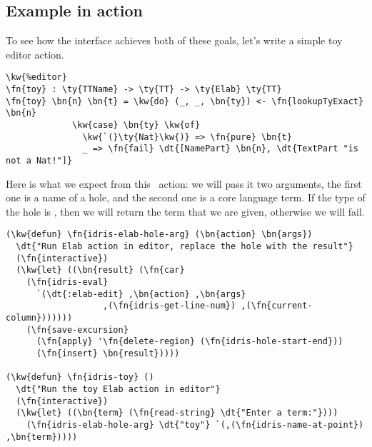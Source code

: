 \subsection{Example in action}\label{ssec:designExample}

To see how the  interface achieves both of these goals, let's
write a simple toy editor action.

\begin{Verbatim}[framesep=2mm, label=\footnotesize{\normalfont{Idris}}, labelposition=topline]
\kw{%editor}
\fn{toy} : \ty{TTName} -> \ty{TT} -> \ty{Elab} \ty{TT}
\fn{toy} \bn{n} \bn{t} = \kw{do} (_, _, \bn{ty}) <- \fn{lookupTyExact} \bn{n}
             \kw{case} \bn{ty} \kw{of}
               \kw{`(}\ty{Nat}\kw{)} => \fn{pure} \bn{t}
               _ => \fn{fail} \dt{[NamePart} \bn{n}, \dt{TextPart "is not a Nat!"]}
\end{Verbatim}

Here is what we expect from this \Elab\ action: we will pass it two arguments,
the first one is a name of a hole, and the second one is a core language term.
If the type of the hole is , then we will return the term that we are
given, otherwise we will fail.

\begin{Verbatim}[framesep=2mm, label=\footnotesize{\normalfont{Emacs Lisp}}, labelposition=topline]
(\kw{defun} \fn{idris-elab-hole-arg} (\bn{action} \bn{args})
  \dt{"Run Elab action in editor, replace the hole with the result"}
  (\fn{interactive})
  (\kw{let} ((\bn{result} (\fn{car}
    (\fn{idris-eval}
      `(\dt{:elab-edit} ,\bn{action} ,\bn{args}
                   ,(\fn{idris-get-line-num}) ,(\fn{current-column}))))))
    (\fn{save-excursion}
      (\fn{apply} '\fn{delete-region} (\fn{idris-hole-start-end}))
      (\fn{insert} \bn{result}))))

(\kw{defun} \fn{idris-toy} ()
  \dt{"Run the toy Elab action in editor"}
  (\fn{interactive})
  (\kw{let} ((\bn{term} (\fn{read-string} \dt{"Enter a term:"})))
    (\fn{idris-elab-hole-arg} \dt{"toy"} `(,(\fn{idris-name-at-point}) ,\bn{term}))))
\end{Verbatim}
